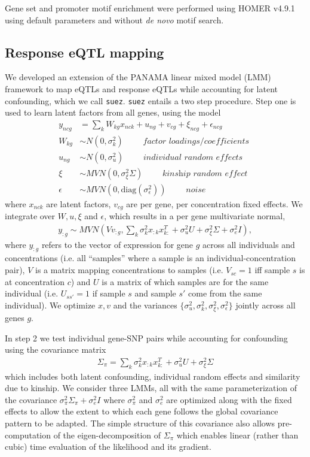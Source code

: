 \documentclass{article}
\begin{document}
Gene set and promoter motif enrichment were performed using HOMER v4.9.1\cite{heinz2010simple} using default parameters and without \emph{de novo} motif search. 

\subsection*{Response eQTL mapping} 

We developed an extension of the PANAMA\cite{Fusi2012} linear mixed model (LMM) framework to map eQTLs and response eQTLs while accounting for latent confounding, which we call \texttt{suez}. \texttt{suez} entails a two step procedure. Step one is used to learn latent factors from all genes, using the model
\begin{align*}
y_{ncg} &= \sum_k W_{kg} x_{nck} + u_{ng} + v_{cg} + \xi_{ncg} + \epsilon_{ncg} \\
W_{kg} & \sim N(0, \sigma^2_k ) \qquad \textit{ factor loadings/coefficients } \\ 
u_{ng} &\sim N(0, \sigma^2_u) \qquad \textit{ individual random effects } \\
\xi &\sim MVN(0, \sigma^2_\xi \Sigma ) \qquad \textit{ kinship random effect }  \\
\epsilon &\sim MVN(0, \text{diag}(\sigma^2_\epsilon)) \qquad \textit{ noise } 
\end{align*}
where $x_{nck}$ are latent factors, $v_{cg}$ are per gene, per concentration fixed effects. We integrate over $W, u, \xi$ and $\epsilon$, which results in a per gene multivariate normal,
\begin{align}
y_{:g} \sim MVN\left( V v_{:g} , \sum_k \sigma^2_k x_{:k} x_{k:}^T + \sigma^2_u U + \sigma^2_\xi \Sigma + \sigma^2_e I \right),
\end{align}
where $y_{:g}$ refers to the vector of expression for gene $g$ across all individuals and concentrations (i.e. all ``samples'' where a sample is an individual-concentration pair), $V$ is a matrix mapping concentrations to samples (i.e. $V_{sc}=1$ iff sample $s$ is at concentration $c$) and $U$ is a matrix of which samples are for the same individual (i.e. $U_{ss'}=1$ if sample $s$ and sample $s'$ come from the same individual). We optimize $x,v$ and the variances $\{ \sigma^2_u, \sigma^2_k,  \sigma^2_\xi, \sigma^2_\epsilon \}$ jointly across all genes $g$. 

In step 2 we test individual gene-SNP pairs while accounting for confounding using the covariance matrix 
\begin{align}
 \Sigma_\pi = \sum_k \sigma^2_k x_{:k} x_{k:}^T + \sigma^2_u U + \sigma^2_\xi \Sigma 
 \end{align}
which includes both latent confounding, individual random effects and similarity due to kinship. We consider three LMMs, all with the same parameterization of the covariance $\sigma^2_\pi \Sigma_\pi + \sigma^2_e I$ where $\sigma^2_\pi$ and $\sigma^2_e$ are optimized along with the fixed effects to allow the extent to which each gene follows the global covariance pattern to be adapted. The simple structure of this covariance also allows pre-computation of the eigen-decomposition of $\Sigma_\pi$ which enables linear (rather than cubic) time evaluation of the likelihood and its gradient. 
\end{document}
